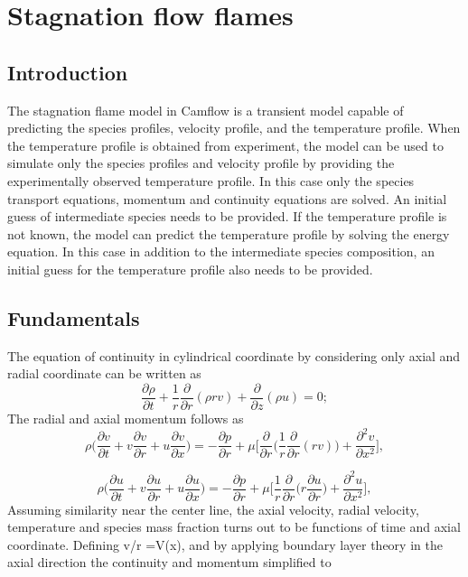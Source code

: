 \newpage
\chapter{Stagnation flow flames}
\section{Introduction}
The stagnation flame model in Camflow is a transient model capable of predicting the species profiles, velocity profile, and the temperature profile.  When the temperature profile is obtained from experiment, the model can be used to simulate only the species profiles and velocity profile by providing the experimentally observed temperature profile. In this case only the species transport equations,  momentum and continuity equations are solved. An initial guess of intermediate species needs to be provided. If the temperature profile is not known, the model can predict the temperature profile by solving the energy equation. In this case in addition to the intermediate species composition, an initial guess for the temperature profile also needs to be provided. 

\section{Fundamentals}
The equation of continuity in cylindrical coordinate by considering only axial and radial coordinate can be written as
\begin{equation}
 \frac{\partial \rho}{\partial t} + \frac{1}{r}\frac{\partial}{\partial r}(\rho rv) + \frac{\partial}{\partial z}(\rho u) = 0;
\end{equation}
The radial and axial momentum follows as
\begin{equation}
 \rho \bigg( 
 \frac{\partial v}{\partial t} +
 v\frac{\partial v}{\partial r}+
 u\frac{\partial v}{\partial x} \bigg) = -\frac{\partial p}{\partial r} +
\mu \bigg[\frac{\partial}{\partial r}\bigg(\frac{1}{r}\frac{\partial}{\partial r}(rv)\bigg) + \frac{\partial^2v}{\partial x^2}\bigg],
\end{equation}

\begin{equation}
 \rho \bigg( 
 \frac{\partial u}{\partial t} +
 v\frac{\partial u}{\partial r}+
 u\frac{\partial u}{\partial x} \bigg) = -\frac{\partial p}{\partial r} +
\mu \bigg[\frac{1}{r} \frac{\partial}{\partial r}\bigg(r\frac{\partial u}{\partial r}\bigg) + \frac{\partial^2u}{\partial x^2}\bigg],
\end{equation}
Assuming similarity near the center line, the axial velocity, radial velocity, temperature and species mass fraction turns out to be functions of time and axial coordinate. Defining v/r =V(x), and by applying boundary layer theory in the axial direction the continuity and momentum simplified to

